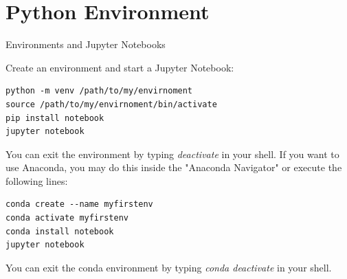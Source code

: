 \documentclass[twoside]{article}
\begin{document}
\maketitle


\newpage
\section{Python Environment}

\begin{task}{Environments and Jupyter Notebooks}{}{}

Create an environment and start a Jupyter Notebook:

\begin{lstlisting}[numbers=none]
python -m venv /path/to/my/envirnoment
source /path/to/my/envirnoment/bin/activate
pip install notebook
jupyter notebook
\end{lstlisting}

You can exit the environment by typing \textit{deactivate} in your shell.
If you want to use Anaconda, you may do this inside the "Anaconda Navigator" or execute the following lines:

\begin{lstlisting}[numbers=none]
conda create --name myfirstenv
conda activate myfirstenv
conda install notebook
jupyter notebook
\end{lstlisting}

You can exit the conda environment by typing \textit{conda deactivate} in your shell.

\end{task}
\end{document}
